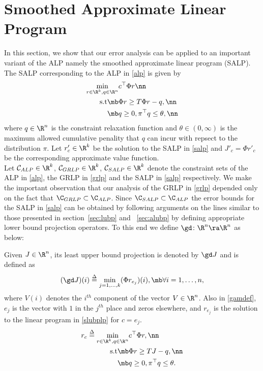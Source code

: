 \section{Smoothed Approximate Linear Program}\label{sec:salp}
In this section, we show that our error analysis can be applied to an important variant of the ALP namely the smoothed approximate linear program (SALP). The SALP corresponding to the ALP in \eqref{alp} is given by 
\begin{align}\label{salp}
\min_{r\in \R^k, q\in \R^n} &c^\top \Phi r\nn\\
\text{s.t}\mb &\Phi r\geq T \Phi r-q,\nn\\
\mb &q\geq 0, \pi^\top q\leq \theta,\nn\\
\end{align}
where $q\in \R^n$ is the constraint relaxation function and $\theta \in (0,\infty)$ is the maximum allowed cumulative penality that $q$ can incur with repsect to the distribution $\pi$. Let $r'_c\in \R^k$ be the solution to the SALP in \eqref{salp} and $J'_c=\Phi r'_c$ be the corresponding approximate value function.\\
 Let $\mathcal{C}_{ALP} \in \R^k$, $\mathcal{C}_{GRLP} \in \R^k$, $\mathcal{C}_{SALP} \in \R^k$ denote the constraint sets of the ALP in \eqref{alp}, the GRLP in \eqref{grlp} and the SALP in \eqref{salp} respectively. We make the important observation that our analysis of the GRLP in \eqref{grlp} depended only on the fact that $\C_{GRLP}\subset \C_{ALP}$. Since $\C_{SALP}\subset \C_{ALP}$ the error bounds for the SALP in \eqref{salp} can be obtained by following arguments on the lines similar to those presented in section~\ref{sec:lubp} and ~\ref{sec:alubp} by defining appropriate lower bound projection operators. To this end we define $\gd \colon \R^n \ra \R^n$ as below:
\begin{definition}\label{slubpop}
Given $J\in \R^n$, its least upper bound projection is denoted by $\gd J$ and is defined as 
\begin{align}\label{gamdef}
(\gd J)(i)\stackrel{\Delta}{=}\underset{j=1,\ldots,k}{\min} (\Phi r_{e_j})(i), \mb \forall i=1,\ldots,n,
\end{align}
where $V(i)$ denotes the $i^{th}$ component of the vector $V\in \R^n$. Also in \eqref{gamdef}, $e_j$ is the vector with $1$ in the $j^{th}$ place and zeros elsewhere, and $r_{e_j}$ is the solution to the linear program in \eqref{slubplp} for $c=e_j$.
\begin{align}\label{slubplp}
r_c\stackrel{\Delta}{=}\min_{r\in \R^k, q\in \R^n} &c^\top \Phi r,\nn\\
\text{s.t}\mb &\Phi r\geq  TJ-q,\nn\\
\mb &q\geq 0, \pi^\top q\leq \theta.
\end{align}
\end{definition}
